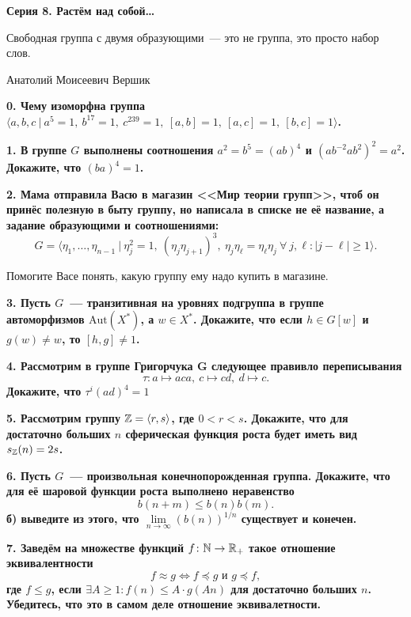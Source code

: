 \documentclass[12pt]{extarticle}
\begin{document}
	\begin{landscape}

	\pagestyle{empty}
	\begin{multicols}{2}

	
	\centerline{\bf{Серия 8.  Растём над собой\ldots }}

	\epigraph{Свободная группа с двумя образующими~--- это не группа, это просто набор слов.}{Анатолий Моисеевич Вершик}

	\bf{0.} Чему изоморфна группа $\langle a, b, c \ \vert \ a^{5} = 1, \ b^{17} = 1, \ c^{239} = 1, \ [a, b] = 1, \ [a, c] = 1 , \ [b, c] = 1 \rangle$.

	\bf{1.} В группе $G$ выполнены соотношения $a^2 = b^5 = (ab)^4$ и $(a b^{-2} a b^2)^2 = a^2$. Докажите, что $(ba)^4 = 1$. 

	\bf{2.}  Мама отправила Васю в магазин <<Мир теории групп>>, чтоб он принёс полезную в быту группу, но написала в списке не её название, а задание образующими и соотношениями:
	\[
		G = \langle \eta_1, \ldots, \eta_{n - 1} \ \vert \ \eta_j^2 = 1, \ (\eta_j \eta_{j + 1})^3, \ \eta_j \eta_{\ell} = \eta_{\ell} \eta_{j} \ \forall \ j, \ell \colon |j - \ell| \ge 1 \rangle. 
	\]

	Помогите Васе понять, какую группу ему надо купить в магазине. 

	\bf{3.} Пусть $G$~--- транзитивная на уровнях подгруппа в группе автоморфизмов $\mathrm{Aut}(X^*)$, а $w \in X^*$. Докажите, что если $h \in G[w]$ и $g(w) \neq w$, то $[h, g] \neq 1$. 

	\bf{4.} Рассмотрим в группе Григорчука $\mathbf{G}$ следующее правивло переписывания 
	\[
		\tau\colon a \mapsto a c a, \ c \mapsto c d, \ d \mapsto c.
	\]
	Докажите, что $\tau^i(ad)^4 = 1$
	
	 	
	\bf{5.} Рассмотрим группу $\mathbb{Z} = \langle r, s \rangle$, где $0 < r < s$. Докажите, что для достаточно больших $n$ сферическая функция роста будет иметь вид  $s_{\mathbb{Z}}(n) = 2s$.  

	\bf{6.} Пусть $G$~--- произвольная конечнопорожденная группа. Докажите, что для её шаровой функции роста выполнено неравенство
	\[
	 	b(n + m) \le b(n)b(m).
	 \] 
	 б) выведите из этого, что $\lim\limits_{n \to \infty} (b(n))^{1/n}$ существует и конечен.

	  \bf{7.} Заведём на множестве функций $f\colon \mathbb{N} \to \mathbb{R}_{+}$ такое отношение эквивалентности 
	 \[
	 	f \approx g \Leftrightarrow  f \preceq g \text{ и } g \preceq f,
	 \]
	 где $f \leqslant g$, если $\exists A \ge 1\colon f(n) \le A \cdot g(An)$ для достаточно больших $n$. Убедитесь, что это в самом деле отношение эквивалетности. 


\end{multicols}
\end{landscape}
\end{document}
